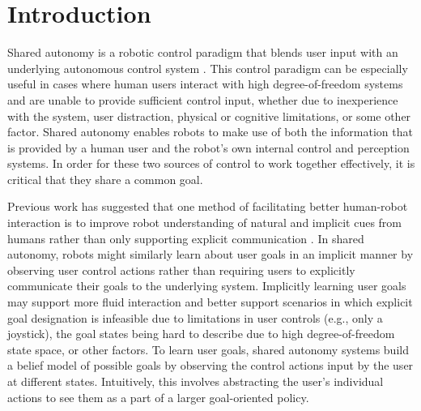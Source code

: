 \documentclass[conference]{IEEEtran}
\begin{document}
\section{Introduction}

Shared autonomy is a robotic control paradigm that blends user input with an underlying autonomous control system \cite{dragan2012formalizing, dragan2013policy, gopinath2017human}. This control paradigm can be especially useful in cases where human users interact with high degree-of-freedom systems and are unable to provide sufficient control input, whether due to inexperience with the system, user distraction, physical or cognitive limitations, or some other factor. Shared autonomy enables robots to make use of both the information that is provided by a human user and the robot's own internal control and perception systems. In order for these two sources of control to work together effectively, it is critical that they share a common goal.

Previous work has suggested that one method of facilitating better human-robot interaction is to improve robot understanding of natural and implicit cues from humans rather than only supporting explicit communication \cite{goodrich2003seven}. In shared autonomy, robots might similarly learn about user goals in an implicit manner by observing user control actions rather than requiring users to explicitly communicate their goals to the underlying system. Implicitly learning user goals may support more fluid interaction and better support scenarios in which explicit goal designation is infeasible due to limitations in user controls (e.g., only a joystick), the goal states being hard to describe due to high degree-of-freedom state space, or other factors. To learn user goals, shared autonomy systems build a belief model of possible goals by observing the control actions input by the user at different states. Intuitively, this involves abstracting the user's individual actions to see them as a part of a larger goal-oriented policy.
\end{document}
